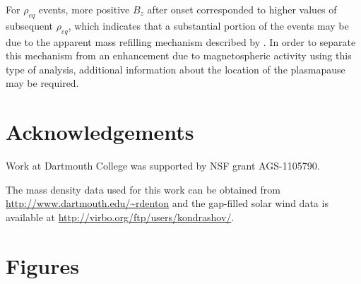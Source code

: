 \documentclass[12pt]{article}
\begin{document}
For $\rho_{eq}$ events, more positive $B_{z}$ after onset corresponded to higher values of subsequent $\rho_{eq}$, which indicates that a substantial portion of the events may be due to the apparent mass refilling mechanism described by \cite{Denton2016}.  In order to separate this mechanism from an enhancement due to magnetospheric activity using this type of analysis, additional information about the location of the plasmapause may be required.

\section{Acknowledgements}

Work at Dartmouth College was supported by NSF grant AGS-1105790. 

The mass density data used for this work can be obtained from \url{http://www.dartmouth.edu/~rdenton} and the gap-filled solar wind data is available at \url{http://virbo.org/ftp/users/kondrashov/}.

\newpage
%


\clearpage

\section{Figures}
\end{document}
